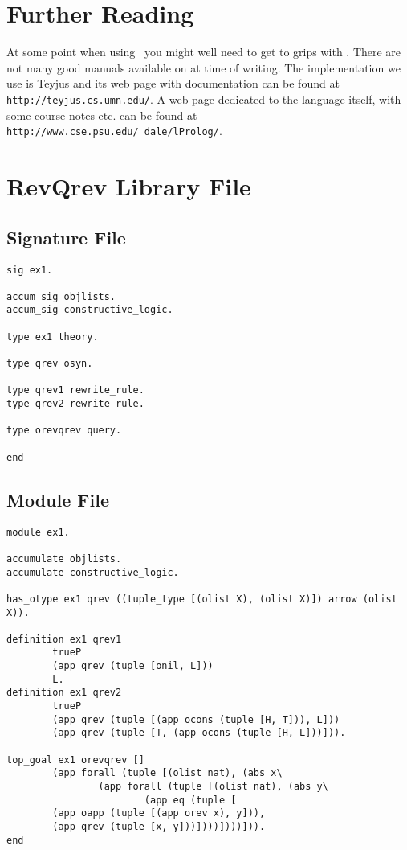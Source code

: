 \section{Further Reading}
At some point when using \lclam\ you might well need to get to grips
with \lprolog.  There are not many good manuals available on \lprolog
at time of writing.  The implementation we use is Teyjus and its web
page with documentation can be found at {\tt
  http://teyjus.cs.umn.edu/}.  A web page dedicated to the language
itself, with some course notes etc. can be found at {\tt
  http://www.cse.psu.edu/~dale/lProlog/}.


\section{RevQrev Library File}
\label{revqrevtf}

\subsection{Signature File}
\begin{verbatim}
sig ex1.

accum_sig objlists.
accum_sig constructive_logic.

type ex1 theory.

type qrev osyn.

type qrev1 rewrite_rule.
type qrev2 rewrite_rule.

type orevqrev query.

end
\end{verbatim}

\subsection{Module File}
\begin{verbatim}
module ex1.

accumulate objlists.
accumulate constructive_logic.

has_otype ex1 qrev ((tuple_type [(olist X), (olist X)]) arrow (olist X)).

definition ex1 qrev1 
        trueP
        (app qrev (tuple [onil, L]))
        L.
definition ex1 qrev2
        trueP
        (app qrev (tuple [(app ocons (tuple [H, T])), L]))
        (app qrev (tuple [T, (app ocons (tuple [H, L]))])).

top_goal ex1 orevqrev []
        (app forall (tuple [(olist nat), (abs x\
                (app forall (tuple [(olist nat), (abs y\
                        (app eq (tuple [
        (app oapp (tuple [(app orev x), y])),
        (app qrev (tuple [x, y]))])))])))])).
end
\end{verbatim}

